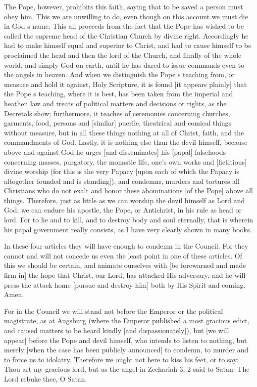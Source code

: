The Pope, however, prohibits this faith, saying that to be
saved a person must obey him. This we are unwilling to do,
even though on this account we must die in God s name. This
all proceeds from the fact that the Pope has wished to be
called the supreme head of the Christian Church by divine
right. Accordingly he had to make himself equal and superior
to Christ, and had to cause himself to be proclaimed the head
and then the lord of the Church, and finally of the whole
world, and simply God on earth, until he has dared to issue
commands even to the angels in heaven. And when we distinguish
the Pope s teaching from, or measure and hold it against, Holy
Scripture, it is found [it appears plainly] that the Pope s
teaching, where it is best, has been taken from the imperial
and heathen law and treats of political matters and decisions
or rights, as the Decretals show; furthermore, it teaches of
ceremonies concerning churches, garments, food, persons and
[similar] puerile, theatrical and comical things without
measure, but in all these things nothing at all of Christ,
faith, and the commandments of God. Lastly, it is nothing else
than the devil himself, because above and against God he urges
[and disseminates] his [papal] falsehoods concerning masses,
purgatory, the monastic life, one's own works and [fictitious]
divine worship (for this is the very Papacy [upon each of
which the Papacy is altogether founded and is standing]), and
condemns, murders and tortures all Christians who do not exalt
and honor these abominations [of the Pope] above all things.
Therefore, just as little as we can worship the devil himself
as Lord and God, we can endure his apostle, the Pope, or
Antichrist, in his rule as head or lord. For to lie and to
kill, and to destroy body and soul eternally, that is wherein
his papal government really consists, as I have very clearly
shown in many books.

In these four articles they will have enough to condemn in the
Council. For they cannot and will not concede us even the
least point in one of these articles. Of this we should be
certain, and animate ourselves with [be forewarned and made
firm in] the hope that Christ, our Lord, has attacked His
adversary, and he will press the attack home [pursue and
destroy him] both by His Spirit and coming. Amen.

For in the Council we will stand not before the Emperor or the
political magistrate, as at Augsburg (where the Emperor
published a most gracious edict, and caused matters to be
heard kindly [and dispassionately]), but [we will appear]
before the Pope and devil himself, who intends to listen to
nothing, but merely [when the case has been publicly
announced] to condemn, to murder and to force us to idolatry.
Therefore we ought not here to kiss his feet, or to say: Thou
art my gracious lord, but as the angel in Zechariah 3, 2 said
to Satan: The Lord rebuke thee, O Satan.




